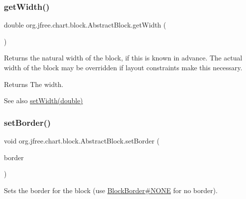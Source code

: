 \subsubsection{\texorpdfstring{get\+Width()}{getWidth()}}
{\footnotesize\ttfamily double org.\+jfree.\+chart.\+block.\+Abstract\+Block.\+get\+Width (\begin{DoxyParamCaption}{ }\end{DoxyParamCaption})}

Returns the natural width of the block, if this is known in advance. The actual width of the block may be overridden if layout constraints make this necessary.

\begin{DoxyReturn}{Returns}
The width.
\end{DoxyReturn}
\begin{DoxySeeAlso}{See also}
\mbox{\hyperlink{classorg_1_1jfree_1_1chart_1_1block_1_1_abstract_block_a67ffb16ede962e6f032d7914bcc528ba}{set\+Width(double)}} 
\end{DoxySeeAlso}
\mbox{\label{classorg_1_1jfree_1_1chart_1_1block_1_1_abstract_block_a859d9c229b154b88978a962e9fd18bb5}} 
\subsubsection{\texorpdfstring{set\+Border()}{setBorder()}\hspace{0.1cm}{\footnotesize\ttfamily [1/2]}}
{\footnotesize\ttfamily void org.\+jfree.\+chart.\+block.\+Abstract\+Block.\+set\+Border (\begin{DoxyParamCaption}\item[{\mbox{\hyperlink{classorg_1_1jfree_1_1chart_1_1block_1_1_block_border}{Block\+Border}}}]{border }\end{DoxyParamCaption})}

Sets the border for the block (use \mbox{\hyperlink{classorg_1_1jfree_1_1chart_1_1block_1_1_block_border_ab51f4a69ef349e2fb741c39d3268b307}{Block\+Border\#\+N\+O\+NE}} for no border).


